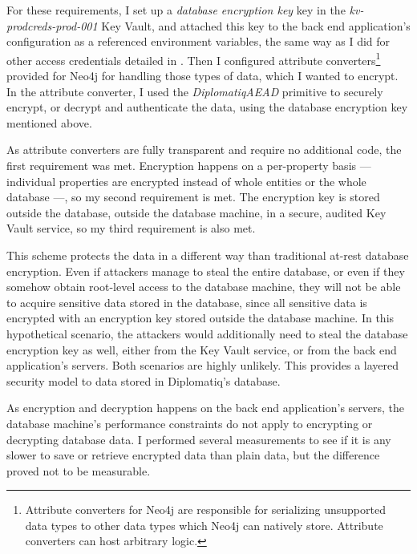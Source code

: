 For these requirements, I set up a \emph{database encryption key} key in the \emph{kv-prodcreds-prod-001} Key Vault, and attached this key to the back end application's configuration as a referenced environment variables, the same way as I did for other access credentials detailed in . Then I configured attribute converters\footnote{Attribute converters for Neo4j are responsible for serializing unsupported data types to other data types which Neo4j can natively store. Attribute converters can host arbitrary logic.} provided for Neo4j for handling those types of data, which I wanted to encrypt. In the attribute converter, I used the \emph{DiplomatiqAEAD} primitive to securely encrypt, or decrypt and authenticate the data, using the database encryption key mentioned above.

As attribute converters are fully transparent and require no additional code, the first requirement was met. Encryption happens on a per-property basis — individual properties are encrypted instead of whole entities or the whole database —, so my second requirement is met. The encryption key is stored outside the database, outside the database machine, in a secure, audited Key Vault service, so my third requirement is also met.

This scheme protects the data in a different way than traditional at-rest database encryption. Even if attackers manage to steal the entire database, or even if they somehow obtain root-level access to the database machine, they will not be able to acquire sensitive data stored in the database, since all sensitive data is encrypted with an encryption key stored outside the database machine. In this hypothetical scenario, the attackers would additionally need to steal the database encryption key as well, either from the Key Vault service, or from the back end application's servers. Both scenarios are highly unlikely. This provides a layered security model to data stored in Diplomatiq's database.

As encryption and decryption happens on the back end application's servers, the database machine's performance constraints do not apply to encrypting or decrypting database data. I performed several measurements to see if it is any slower to save or retrieve encrypted data than plain data, but the difference proved not to be measurable.
